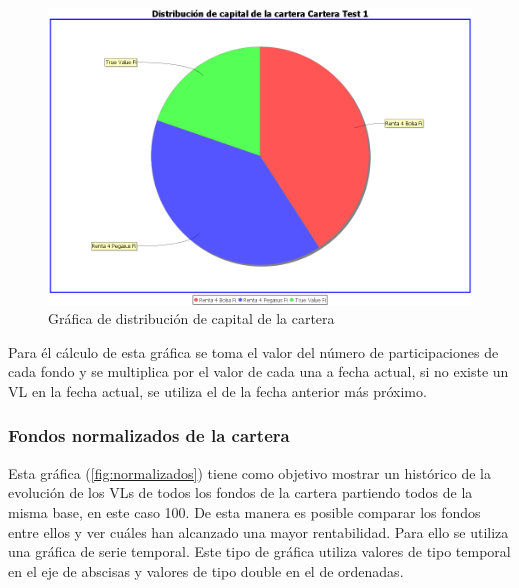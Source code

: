 \documentclass[12pt, a4paper]{book}
\begin{document}
	\begin{figure}[htbp]
	\centering
	\includegraphics[width=\textwidth]{figuras/distribucion.PNG}
	\caption{Gráfica de distribución de capital de la cartera}
	\label{fig:distribucion}
	\end {figure}
	
Para él cálculo de esta gráfica se toma el valor del número de participaciones de cada fondo y se multiplica por el valor de cada una a fecha actual, si no existe un \gls{VL} en la fecha actual, se utiliza el de la fecha anterior más próximo.\\
\newpage

\subsubsection{Fondos normalizados de la cartera}

Esta gráfica (\ref{fig:normalizados}) tiene como objetivo mostrar un histórico de la evolución de los \gls{VL}s de todos los fondos de la cartera partiendo todos de la misma base, en este caso 100. De esta manera es posible comparar los fondos entre ellos y ver cuáles han alcanzado una mayor rentabilidad. Para ello se utiliza una gráfica de serie temporal. Este tipo de gráfica utiliza valores de tipo temporal en el eje de abscisas y valores de tipo double en el de ordenadas.\\
\end{document}
